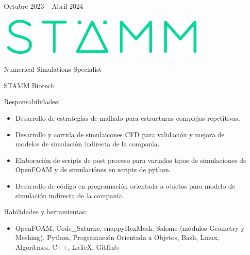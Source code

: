 \documentclass[a4paper,10pt]{article}
\newlength{\cvcolumngapwidth}
\newlength{\cvleftcolumnwidth}
\newlength{\cvrightcolumnwidth}
\newcommand{\cvtitlestyle}[1]{{\large\cvtitlefont\textcolor{cvtitlecolor}{#1}}}
\newcommand{\cvsubtitlestyle}[1]{{\cvtitlefont\textcolor{cvtitlecolor}{#1}}}
\newcommand{\cvdurationstyle}[1]{{\small\cvdurationfont\textcolor{cvdurationcolor}{#1}}}
\newlength{\cvafteritemskipamount}
\newlength{\cvaftertitleskipamount}
\newlength{\cvparskip}
\newcommand{\cvitem}[2]{
    \begin{minipage}[t]{\cvleftcolumnwidth}
        \raggedleft #1
    \end{minipage}%
    \hspace{\cvcolumngapwidth}%
    \begin{minipage}[t]{\cvrightcolumnwidth}
        \setlength{\parskip}{\cvparskip} #2
    \end{minipage}

    \vspace{\cvafteritemskipamount}
}
\newcommand{\cvtitle}[1]{
    \cvtitlestyle{#1}

    \vspace{\cvaftertitleskipamount}
    \vspace{-\cvparskip}
}
\begin{document}
\cvitem{
	\cvdurationstyle{Octubre 2023 -- Abril 2024}
}{
	\begin{minipage}{0.1\textwidth}
		\centering
		\includegraphics[width=0.8\textwidth]{../logos-photos/Logo_STAMM.png}   
	\end{minipage}
	\cvtitle{Numerical Simulations Specialist}
	
	\cvsubtitlestyle{STÄMM Biotech}

    Responsabilidades:
    \begin{itemize}
        \item Desarrollo de estrategias de mallado para estructuras complejas repetitivas.
        \item Desarrollo y corrida de simulaicones CFD para validación y mejora de modelos de simulación
            indirecta de la companía.
        \item Elaboración de scripts de post proceso para variados tipos de simulaciones de OpenFOAM y de simulaciónes
            en scripts de python.
        \item Desarrollo de código en programación orientada a objetos para modelo de simulación indirecta de la
            companía.
    \end{itemize}

    Habilidades y herramientas:
    \begin{itemize}
        \item OpenFOAM, Code\_Saturne, snappyHexMesh, Salome (módulos Geometry y Meshing), Python, Programación
            Orientada a Objetos, Bash, Linux, Algorítmos, C++, LaTeX, GitHub
    \end{itemize}
	
}
\end{document}
